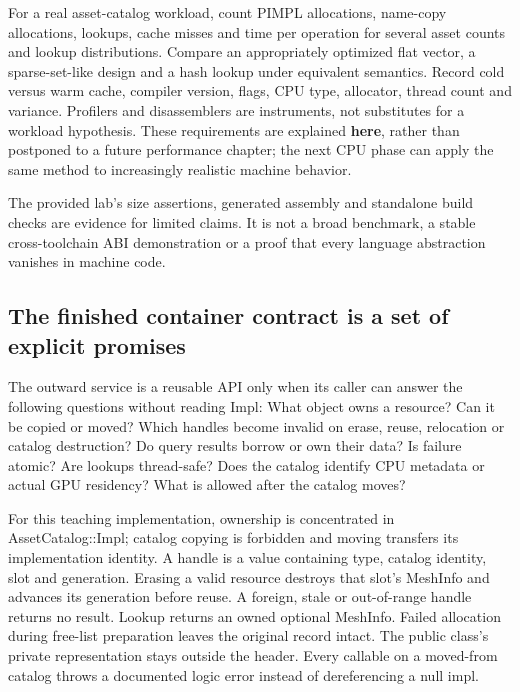 For a real asset-catalog workload, count PIMPL allocations, name-copy allocations, lookups, cache misses and time per operation for several asset counts and lookup distributions. Compare an appropriately optimized flat vector, a sparse-set-like design and a hash lookup under equivalent semantics. Record cold versus warm cache, compiler version, flags, CPU type, allocator, thread count and variance. Profilers and disassemblers are instruments, not substitutes for a workload hypothesis. These requirements are explained \textbf{here}, rather than postponed to a future performance chapter; the next CPU phase can apply the same method to increasingly realistic machine behavior.

The provided lab's size assertions, generated assembly and standalone build checks are evidence for limited claims. It is not a broad benchmark, a stable cross-toolchain ABI demonstration or a proof that every language abstraction vanishes in machine code.

\subsection{The finished container contract is a set of explicit promises}\label{01-foundations-i-ch007-the-finished-container-contract-is-a-set-of-explicit-promises}

The outward service is a reusable API only when its caller can answer the following questions without reading Impl: What object owns a resource? Can it be copied or moved? Which handles become invalid on erase, reuse, relocation or catalog destruction? Do query results borrow or own their data? Is failure atomic? Are lookups thread-safe? Does the catalog identify CPU metadata or actual GPU residency? What is allowed after the catalog moves?

For this teaching implementation, ownership is concentrated in AssetCatalog::Impl; catalog copying is forbidden and moving transfers its implementation identity. A handle is a value containing type, catalog identity, slot and generation. Erasing a valid resource destroys that slot's MeshInfo and advances its generation before reuse. A foreign, stale or out-of-range handle returns no result. Lookup returns an owned optional MeshInfo. Failed allocation during free-list preparation leaves the original record intact. The public class's private representation stays outside the header. Every callable on a moved-from catalog throws a documented logic error instead of dereferencing a null impl.

